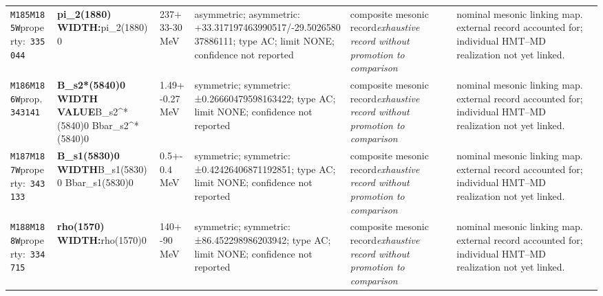 \begin{landscape}
\begin{longtable}{L{1.85cm}L{4.45cm}L{2.35cm}L{4.05cm}L{3.35cm}L{7.15cm}}
\texttt{M185}\newline \texttt{M185W}\newline property:\ \texttt{335044} & \textbf{pi\_\allowbreak{}2(1880) WIDTH:}\newline pi\_\allowbreak{}2(1880)0 & 237+33-30\,MeV & asymmetric; asymmetric: +33.317197463990517/-29.502658037886111; type AC; limit NONE; confidence not reported & composite mesonic record\newline \emph{exhaustive record without promotion to comparison} & nominal mesonic linking map. external record accounted for; individual HMT--MD realization not yet linked. \\
\texttt{M186}\newline \texttt{M186W}\newline prop.\ \texttt{343141} & \textbf{B\_\allowbreak{}s2*(5840)0 WIDTH VALUE}\newline B\_\allowbreak{}s2\textasciicircum{}*(5840)0 \textbar{}\allowbreak{} Bbar\_\allowbreak{}s2\textasciicircum{}*(5840)0 & 1.49+-0.27\,MeV & symmetric; symmetric: ±0.26660479598163422; type AC; limit NONE; confidence not reported & composite mesonic record\newline \emph{exhaustive record without promotion to comparison} & nominal mesonic linking map. external record accounted for; individual HMT--MD realization not yet linked. \\
\texttt{M187}\newline \texttt{M187W}\newline property:\ \texttt{343133} & \textbf{B\_\allowbreak{}s1(5830)0 WIDTH}\newline B\_\allowbreak{}s1(5830)0 \textbar{}\allowbreak{} Bbar\_\allowbreak{}s1(5830)0 & 0.5+-0.4\,MeV & symmetric; symmetric: ±0.42426406871192851; type AC; limit NONE; confidence not reported & composite mesonic record\newline \emph{exhaustive record without promotion to comparison} & nominal mesonic linking map. external record accounted for; individual HMT--MD realization not yet linked. \\
\texttt{M188}\newline \texttt{M188W}\newline property:\ \texttt{334715} & \textbf{rho(1570) WIDTH:}\newline rho(1570)0 & 140+-90\,MeV & symmetric; symmetric: ±86.452298986203942; type AC; limit NONE; confidence not reported & composite mesonic record\newline \emph{exhaustive record without promotion to comparison} & nominal mesonic linking map. external record accounted for; individual HMT--MD realization not yet linked. \\

\end{longtable}
\end{landscape}

